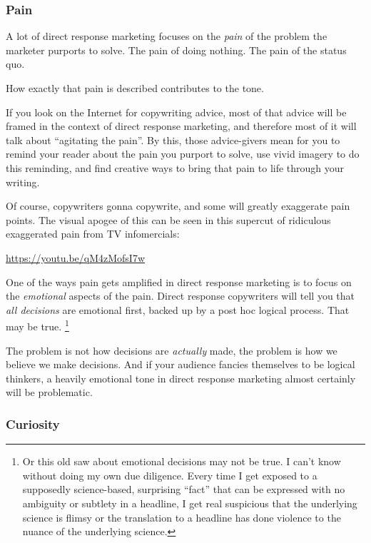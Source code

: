 \documentclass[13pt,]{tufte-handout}
\begin{document}
\hypertarget{pain}{%
\subsubsection{Pain}\label{pain}}

A lot of direct response marketing focuses on the \emph{pain} of the
problem the marketer purports to solve. The pain of doing nothing. The
pain of the status quo.

How exactly that pain is described contributes to the tone.

If you look on the Internet for copywriting advice, most of that advice
will be framed in the context of direct response marketing, and
therefore most of it will talk about ``agitating the pain''. By this,
those advice-givers mean for you to remind your reader about the pain
you purport to solve, use vivid imagery to do this reminding, and find
creative ways to bring that pain to life through your writing.

Of course, copywriters gonna copywrite, and some will greatly exaggerate
pain points. The visual apogee of this can be seen in this supercut of
ridiculous exaggerated pain from TV infomercials:

\url{https://youtu.be/qM4zMofsI7w}

One of the ways pain gets amplified in direct response marketing is to
focus on the \emph{emotional} aspects of the pain. Direct response
copywriters will tell you that \emph{all decisions} are emotional first,
backed up by a post hoc logical process. That may be true. \footnote{Or
  this old saw about emotional decisions may not be true. I can't know
  without doing my own due diligence. Every time I get exposed to a
  supposedly science-based, surprising ``fact'' that can be expressed
  with no ambiguity or subtlety in a headline, I get real suspicious
  that the underlying science is flimsy or the translation to a headline
  has done violence to the nuance of the underlying science.}

The problem is not how decisions are \emph{actually} made, the problem
is how we believe we make decisions. And if your audience fancies
themselves to be logical thinkers, a heavily emotional tone in direct
response marketing almost certainly will be problematic.

\hypertarget{curiosity}{%
\subsubsection{Curiosity}\label{curiosity}}
\end{document}

